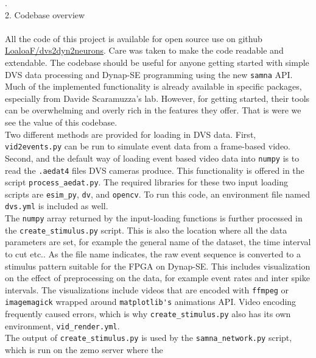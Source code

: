 \documentclass[8pt]{beamer}
\begin{document}
\begin{small}
	\tiny .\\
	\large{2. Codebase overview} \\~\\
	\selectfont
	\small
	All the code of this project is available for open source use on github
	\href{https://github.com/LoaloaF/dvs2dyn2neurons}{LoaloaF/dvs2dyn2neurons}.
	Care was taken to make the code readable and extendable. The codebase should
	be useful for anyone getting started with simple DVS data processing and
	Dynap-SE programming using the new \verb|samna| API. Much of the implemented
	functionality is already available in specific packages, especially from
	Davide Scaramuzza's lab. However, for getting started, their tools can be
	overwhelming and overly rich in the features they offer. That is were we see
	the value of this codebase. \\ \vspace{.1cm}
	Two different methods are provided for loading in DVS data. First,
	\verb|vid2events.py| can be run to simulate event data from a frame-based
	video. Second, and the default way of loading event based video data into
	\verb|numpy| is to read the \verb|.aedat4| files DVS cameras produce. This
	functionality is offered in the script \verb|process_aedat.py|. The required
	libraries for these two input loading scripts are \verb|esim_py|, \verb|dv|,
	and \verb|opencv|. To run this code, an environment file named
	\verb|dvs.yml| is included as well. \\ \vspace{.1cm}
	The \verb|numpy| array returned by the input-loading functions is further
	processed in the \verb|create_stimulus.py| script. This is also the location
	where all the data parameters are set, for example the general name of the
	dataset, the time interval to cut etc.. As the file name indicates, the raw
	event sequence is converted to a stimulus pattern suitable for the FPGA on
	Dynap-SE. This includes visualization on the effect of preprocessing on the
	data, for example event rates and inter spike intervals. The visualizations
	include videos that are encoded with \verb|ffmpeg| or \verb|imagemagick|
	wrapped around \verb|matplotlib's| animations API. Video encoding frequently
	caused errors, which is why \verb|create_stimulus.py| also has its own
	environment, \verb|vid_render.yml|. \\ \vspace{.1cm}
	The output of \verb|create_stimulus.py| is used by the
	\verb|samna_network.py| script, which is run on the zemo server where the

\end{small}
\end{document}
